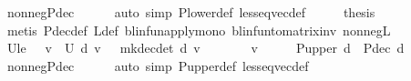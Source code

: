 \begin{isabellebody}
\ nonneg{\isacharunderscore}{\kern0pt}P{\isacharunderscore}{\kern0pt}dec\isanewline
\ \ \ \ \isamarkupfalse%
\ {\isacharparenleft}{\kern0pt}auto\ simp{\isacharcolon}{\kern0pt}\ P{\isacharunderscore}{\kern0pt}lower{\isacharunderscore}{\kern0pt}def\ less{\isacharunderscore}{\kern0pt}eq{\isacharunderscore}{\kern0pt}vec{\isacharunderscore}{\kern0pt}def{\isacharparenright}{\kern0pt}\isanewline
\ \ \isamarkupfalse%
\ \isamarkupfalse%
\ {\isacharquery}{\kern0pt}thesis\isanewline
\ \ \ \ \isamarkupfalse%
\ {\isacharparenleft}{\kern0pt}metis\ P{\isacharunderscore}{\kern0pt}dec{\isacharunderscore}{\kern0pt}def\ {\isasymP}\isactrlsub L{\isacharunderscore}{\kern0pt}def\ blinfun{\isacharunderscore}{\kern0pt}apply{\isacharunderscore}{\kern0pt}mono\ blinfun{\isacharunderscore}{\kern0pt}to{\isacharunderscore}{\kern0pt}matrix{\isacharunderscore}{\kern0pt}inv\ nonneg{\isacharunderscore}{\kern0pt}{\isasymP}\isactrlsub L{\isacharparenright}{\kern0pt}\isanewline
{}\isamarkupfalse%
%
\endisatagproof
{\isafoldproof}%
%
\isadelimproof
\isanewline
%
\endisadelimproof
\isanewline
{}\isamarkupfalse%
\ {\isasymP}\isactrlsub U{\isacharunderscore}{\kern0pt}le{\isacharunderscore}{\kern0pt}{\isasymP}\ {\isachardoublequoteopen}{}\ {\isasymle}\ v\ {\isasymLongrightarrow}\ {\isasymP}\isactrlsub U\ d\ v\ {\isasymle}\ {\isasymP}\ {\isacharparenleft}{\kern0pt}mk{\isacharunderscore}{\kern0pt}dec{\isacharunderscore}{\kern0pt}det\ d{\isacharparenright}{\kern0pt}\ v{\isachardoublequoteclose}\isanewline
%
\isadelimproof
%
\endisadelimproof
%
\isatagproof
{}\isamarkupfalse%
\ {\isacharminus}{\kern0pt}\isanewline
\ \ \isamarkupfalse%
\ {\isachardoublequoteopen}{}\ {\isasymle}\ v{\isachardoublequoteclose}\isanewline
\ \ \isamarkupfalse%
\ \isamarkupfalse%
\ {\isachardoublequoteopen}P{\isacharunderscore}{\kern0pt}upper\ d\ {\isasymle}\ P{\isacharunderscore}{\kern0pt}dec\ d{\isachardoublequoteclose}\isanewline
\ \ \ \ \isamarkupfalse%
\ nonneg{\isacharunderscore}{\kern0pt}P{\isacharunderscore}{\kern0pt}dec\isanewline
\ \ \ \ \isamarkupfalse%
\ {\isacharparenleft}{\kern0pt}auto\ simp{\isacharcolon}{\kern0pt}\ P{\isacharunderscore}{\kern0pt}upper{\isacharunderscore}{\kern0pt}def\ less{\isacharunderscore}{\kern0pt}eq{\isacharunderscore}{\kern0pt}vec{\isacharunderscore}{\kern0pt}def{\isacharparenright}{\kern0pt}\isanewline

\end{isabellebody}
